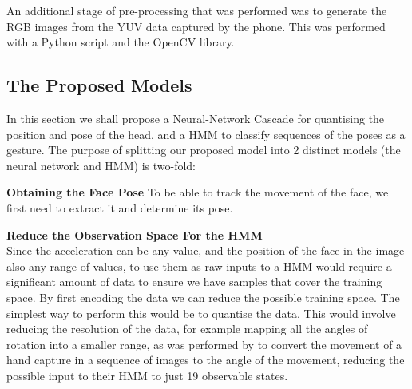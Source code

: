An additional stage of pre-processing that was performed was to generate the RGB images from the YUV data captured by the phone. This was performed with a Python script and the OpenCV library.

\subsection{The Proposed Models} %
In this section we shall propose a Neural-Network Cascade for quantising the position and pose of the head, and a HMM to classify sequences of the poses as a gesture.
The purpose of splitting our proposed model into 2 distinct models (the neural network and HMM) is two-fold:

\nl\textbf{Obtaining the Face Pose}\nl
To be able to track the movement of the face, we first need to extract it and determine its pose.

\nl\textbf{Reduce the Observation Space For the HMM}\\
Since the acceleration can be any value, and the position of the face in the image also any range of values, to use them as raw inputs to a HMM would require a significant amount of data to ensure we have samples that cover the training space.
By first encoding the data we can reduce the possible training space.
The simplest way to perform this would be to quantise the data. This would involve reducing the resolution of the data, for example mapping all the angles of rotation into a smaller range, as was performed by \citeauthor{elmezain2008hidden} to convert the movement of a hand capture in a sequence of images to the angle of the movement\cite{elmezain2008hidden}, reducing the possible input to their HMM to just 19 observable states.

